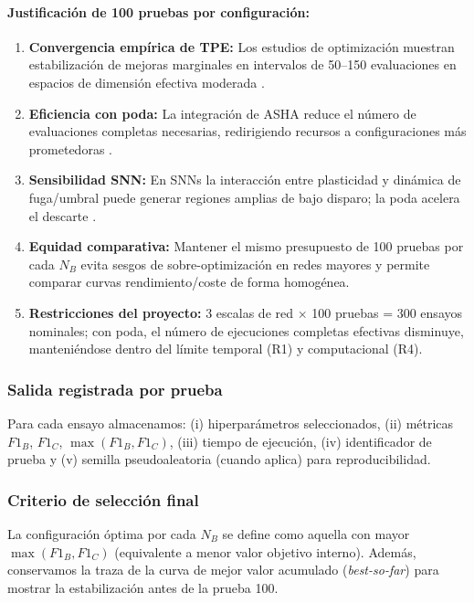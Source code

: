 \paragraph{Justificación de 100 pruebas por configuración:}
\begin{enumerate}
    \item \textbf{Convergencia empírica de TPE:} Los estudios de optimización muestran estabilización de mejoras marginales en intervalos de 50--150 evaluaciones en espacios de dimensión efectiva moderada \cite{bergstra_random_2012, akiba_optuna_2019}.
    \item \textbf{Eficiencia con poda:} La integración de ASHA reduce el número de evaluaciones completas necesarias, redirigiendo recursos a configuraciones más prometedoras \cite{li_system_2020, broutonlab_efficient_2021}.
    \item \textbf{Sensibilidad SNN:} En SNNs la interacción entre plasticidad y dinámica de fuga/umbral puede generar regiones amplias de bajo disparo; la poda acelera el descarte \cite{firmin_parallel_2024, parsa_bayesian-based_2019}.
    \item \textbf{Equidad comparativa:} Mantener el mismo presupuesto de 100 pruebas por cada $N_B$ evita sesgos de sobre-optimización en redes mayores y permite comparar curvas rendimiento/coste de forma homogénea.
    \item \textbf{Restricciones del proyecto:} 3 escalas de red $\times$ 100 pruebas = 300 ensayos nominales; con poda, el número de ejecuciones completas efectivas disminuye, manteniéndose dentro del límite temporal (R1) y computacional (R4).
\end{enumerate}

\subsubsection{Salida registrada por prueba}
Para cada ensayo almacenamos: (i) hiperparámetros seleccionados, (ii) métricas $F1_B$, $F1_C$, $\max(F1_B,F1_C)$, (iii) tiempo de ejecución, (iv) identificador de prueba y (v) semilla pseudoaleatoria (cuando aplica) para reproducibilidad.

\subsubsection{Criterio de selección final}
La configuración óptima por cada $N_B$ se define como aquella con mayor $\max(F1_B,F1_C)$ (equivalente a menor valor objetivo interno). Además, conservamos la traza de la curva de mejor valor acumulado (\emph{best-so-far}) para mostrar la estabilización antes de la prueba 100.


